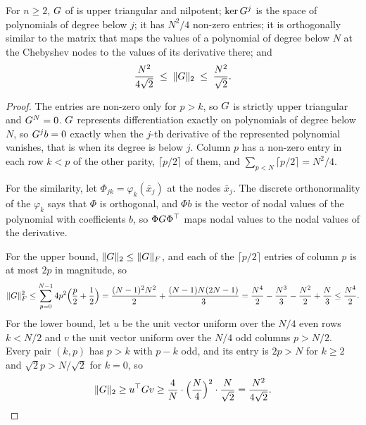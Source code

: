 \begin{proposition}
\label{prop:G-structure}
For $n\ge2$, $G$ of  is upper triangular and nilpotent; $\ker G^j$ is the space of polynomials of degree below $j$; it has $N^2/4$ non-zero entries; it is orthogonally similar to the matrix that maps the values of a polynomial of degree below $N$ at the Chebyshev nodes to the values of its derivative there; and
\begin{equation}
    \frac{N^2}{4\sqrt2}\;\le\;\|G\|_2\;\le\;\frac{N^2}{\sqrt2}.
    \label{eq:app-G-bounds}
\end{equation}
\end{proposition}
\begin{proof}
The entries are non-zero only for $p>k$, so $G$ is strictly upper triangular and $G^N=0$. $G$ represents differentiation exactly on polynomials of degree below $N$, so $G^jb=0$ exactly when the $j$-th derivative of the represented polynomial vanishes, that is when its degree is below $j$. Column $p$ has a non-zero entry in each row $k<p$ of the other parity, $\lceil p/2\rceil$ of them, and $\sum_{p<N}\lceil p/2\rceil=N^2/4$.

For the similarity, let $\Phi_{jk}=\varphi_k(\bar x_j)$ at the nodes $\bar x_j$. The discrete orthonormality of the $\varphi_k$ says that $\Phi$ is orthogonal, and $\Phi b$ is the vector of nodal values of the polynomial with coefficients $b$, so $\Phi G\Phi^{\top}$ maps nodal values to the nodal values of the derivative.

For the upper bound, $\|G\|_2\le\|G\|_F$, and each of the $\lceil p/2\rceil$ entries of column $p$ is at most $2p$ in magnitude, so
\begin{equation*}
    \|G\|_F^2\le\sum_{p=0}^{N-1}4p^2\Bigl(\frac p2+\frac12\Bigr)=\frac{(N-1)^2N^2}{2}+\frac{(N-1)N(2N-1)}{3}=\frac{N^4}{2}-\frac{N^3}{3}-\frac{N^2}{2}+\frac N3\le\frac{N^4}{2}.
\end{equation*}
For the lower bound, let $u$ be the unit vector uniform over the $N/4$ even rows $k<N/2$ and $v$ the unit vector uniform over the $N/4$ odd columns $p>N/2$. Every pair $(k,p)$ has $p>k$ with $p-k$ odd, and its entry is $2p>N$ for $k\ge2$ and $\sqrt2p>N/\sqrt2$ for $k=0$, so
\begin{equation*}
    \|G\|_2\ge u^{\top}G v\ge\frac{4}{N}\cdot\Bigl(\frac N4\Bigr)^2\cdot\frac{N}{\sqrt2}=\frac{N^2}{4\sqrt2}. \qedhere
\end{equation*}
\end{proof}

